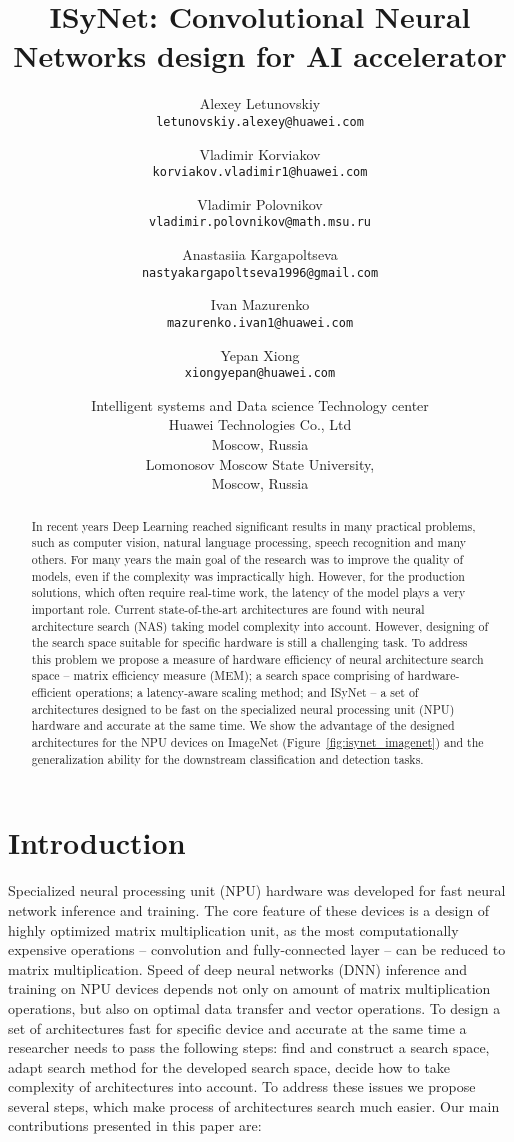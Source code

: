 \documentclass[letterpaper]{article}
\title{ISyNet: Convolutional Neural Networks design for AI accelerator}
\author {
    Alexey Letunovskiy\\
    {\tt\small letunovskiy.alexey@huawei.com}\\
    \and
    Vladimir Korviakov\\
    {\tt\small korviakov.vladimir1@huawei.com}\\
    \and
    Vladimir Polovnikov\\
    {\tt\small vladimir.polovnikov@math.msu.ru}\\
    \and
    Anastasiia Kargapoltseva\\
    {\tt\small nastyakargapoltseva1996@gmail.com}\\
    \and
    Ivan Mazurenko\\
    {\tt\small mazurenko.ivan1@huawei.com}\\
    \and
    Yepan Xiong\\
    {\tt\small xiongyepan@huawei.com}\\
    \and
     Intelligent systems and Data science Technology center\\
    Huawei Technologies Co., Ltd\\
    Moscow, Russia\\
     Lomonosov Moscow State University,\\
    Moscow, Russia
}
\begin{document}
\maketitle

\begin{abstract}
	In recent years Deep Learning reached significant results in many practical problems, such as computer vision, natural language processing, speech recognition and many others. For many years the main goal of the research was to improve the quality of models, even if the complexity was impractically high. However, for the production solutions, which often require real-time work, the latency of the model plays a very important role. Current state-of-the-art architectures are found with neural architecture search (NAS) taking model complexity into account. However, designing of the search space suitable for specific hardware is still a challenging task. To address this problem we propose a measure of hardware efficiency of neural architecture search space -- matrix efficiency measure (MEM); a search space comprising of hardware-efficient operations; a latency-aware scaling method; and ISyNet -- a set of architectures designed to be fast on the specialized neural processing unit (NPU) hardware and accurate at the same time. We show the advantage of the designed architectures for the NPU devices on ImageNet (Figure~\ref{fig:isynet_imagenet}) and the generalization ability for the downstream classification and detection tasks.
\end{abstract}

\section{Introduction}
\label{sec:intro}
Specialized neural processing unit (NPU) hardware was developed for fast neural network inference and training. The core feature of these devices is a design of highly optimized matrix multiplication unit, as the most computationally expensive operations -- convolution and fully-connected layer -- can be reduced to matrix multiplication. Speed of deep neural networks (DNN) inference and training on NPU devices depends not only on amount of matrix multiplication operations, but also on optimal data transfer and vector operations. To design a set of architectures fast for specific device and accurate at the same time a researcher needs to pass the following steps: find and construct a search space, adapt search method for the developed search space, decide how to take complexity of architectures into account. To address these issues we propose several steps, which make process of architectures search much easier.
Our main contributions presented in this paper are:
\end{document}
